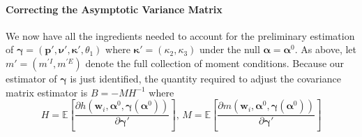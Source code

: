 \documentclass[12pt]{article}
\begin{document}
\paragraph{Correcting the Asymptotic Variance Matrix}
We now have all the ingredients needed to account for the preliminary estimation of $\boldsymbol{\gamma} = (\mathbf{p}', \boldsymbol{\nu}', \boldsymbol{\kappa}', \theta_1)$ where $\boldsymbol{\kappa}' = (\kappa_2, \kappa_3)$ under the null $\boldsymbol{\alpha} = \boldsymbol{\alpha}^0$.
As above, let $m' = (m^{'I}, m^{'E})$ denote the full collection of moment conditions.
Because our estimator of $\boldsymbol{\gamma}$ is just identified, the quantity required to adjust the covariance matrix estimator is $B = -MH^{-1}$ where 
\[
  H = \mathbb{E}\left[ \frac{\partial h\left(\mathbf{w}_i, \boldsymbol{\alpha}^0, \boldsymbol{\gamma}(\boldsymbol{\alpha}^0)\right)}{\partial \boldsymbol{\gamma}'} \right], \,
  M = \mathbb{E}\left[ \frac{\partial m(\mathbf{w}_i, \boldsymbol{\alpha}^0, \boldsymbol{\gamma}(\boldsymbol{\alpha}^0))}{\partial \boldsymbol{\gamma}'} \right]  
\]
\end{document}
